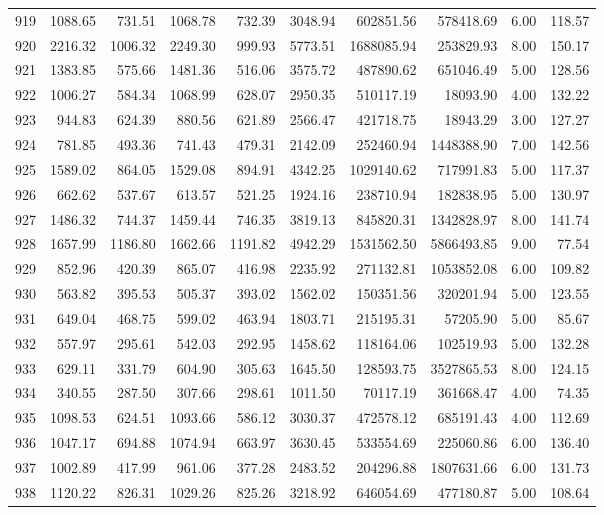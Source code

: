 \begin{tabular}{lrrrrrrrrr}
919 & 1088.65 & 731.51 & 1068.78 & 732.39 & 3048.94 & 602851.56 & 578418.69 & 6.00 & 118.57 \\
920 & 2216.32 & 1006.32 & 2249.30 & 999.93 & 5773.51 & 1688085.94 & 253829.93 & 8.00 & 150.17 \\
921 & 1383.85 & 575.66 & 1481.36 & 516.06 & 3575.72 & 487890.62 & 651046.49 & 5.00 & 128.56 \\
922 & 1006.27 & 584.34 & 1068.99 & 628.07 & 2950.35 & 510117.19 & 18093.90 & 4.00 & 132.22 \\
923 & 944.83 & 624.39 & 880.56 & 621.89 & 2566.47 & 421718.75 & 18943.29 & 3.00 & 127.27 \\
924 & 781.85 & 493.36 & 741.43 & 479.31 & 2142.09 & 252460.94 & 1448388.90 & 7.00 & 142.56 \\
925 & 1589.02 & 864.05 & 1529.08 & 894.91 & 4342.25 & 1029140.62 & 717991.83 & 5.00 & 117.37 \\
926 & 662.62 & 537.67 & 613.57 & 521.25 & 1924.16 & 238710.94 & 182838.95 & 5.00 & 130.97 \\
927 & 1486.32 & 744.37 & 1459.44 & 746.35 & 3819.13 & 845820.31 & 1342828.97 & 8.00 & 141.74 \\
928 & 1657.99 & 1186.80 & 1662.66 & 1191.82 & 4942.29 & 1531562.50 & 5866493.85 & 9.00 & 77.54 \\
929 & 852.96 & 420.39 & 865.07 & 416.98 & 2235.92 & 271132.81 & 1053852.08 & 6.00 & 109.82 \\
930 & 563.82 & 395.53 & 505.37 & 393.02 & 1562.02 & 150351.56 & 320201.94 & 5.00 & 123.55 \\
931 & 649.04 & 468.75 & 599.02 & 463.94 & 1803.71 & 215195.31 & 57205.90 & 5.00 & 85.67 \\
932 & 557.97 & 295.61 & 542.03 & 292.95 & 1458.62 & 118164.06 & 102519.93 & 5.00 & 132.28 \\
933 & 629.11 & 331.79 & 604.90 & 305.63 & 1645.50 & 128593.75 & 3527865.53 & 8.00 & 124.15 \\
934 & 340.55 & 287.50 & 307.66 & 298.61 & 1011.50 & 70117.19 & 361668.47 & 4.00 & 74.35 \\
935 & 1098.53 & 624.51 & 1093.66 & 586.12 & 3030.37 & 472578.12 & 685191.43 & 4.00 & 112.69 \\
936 & 1047.17 & 694.88 & 1074.94 & 663.97 & 3630.45 & 533554.69 & 225060.86 & 6.00 & 136.40 \\
937 & 1002.89 & 417.99 & 961.06 & 377.28 & 2483.52 & 204296.88 & 1807631.66 & 6.00 & 131.73 \\
938 & 1120.22 & 826.31 & 1029.26 & 825.26 & 3218.92 & 646054.69 & 477180.87 & 5.00 & 108.64 \\

\end{tabular}
